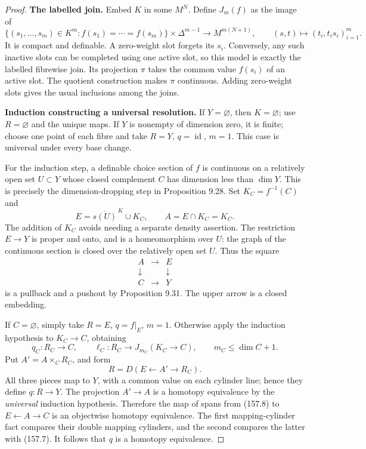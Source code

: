 \begin{proof}
\textbf{The labelled join.}
Embed \(K\) in some \(M^N\). Define \(J_m(f)\) as the image of
\[
 \{(s_1,\ldots,s_m)\in K^m:f(s_1)=\cdots=f(s_m)\}
          \times\Delta^{m-1}
 \longrightarrow M^{m(N+1)},\qquad
 (s,t)\longmapsto(t_i,t_i s_i)_{i=1}^m.
 \tag{157.5}
\]
It is compact and definable. A zero-weight slot forgets its \(s_i\). Conversely, any such inactive slots can be completed using one active slot, so this model is exactly the labelled fibrewise join. Its projection \(\pi\) takes the common value \(f(s_i)\) of an active slot. The quotient construction makes \(\pi\) continuous. Adding zero-weight slots gives the usual inclusions among the joins.

\textbf{Induction constructing a universal resolution.}
If \(Y=\varnothing\), then \(K=\varnothing\); use \(R=\varnothing\) and the unique maps. If \(Y\) is nonempty of dimension zero, it is finite; choose one point of each fibre and take \(R=Y\), \(q=\operatorname{id}\), \(m=1\). This case is universal under every base change.

For the induction step, a definable choice section of \(f\) is continuous on a relatively open set \(U\subset Y\) whose closed complement \(C\) has dimension less than \(\dim Y\). This is precisely the dimension-dropping step in Proposition 9.28. Set \(K_C=f^{-1}(C)\) and
\[
 E=\overline{s(U)}^{\,K}\cup K_C,\qquad
 A=E\cap K_C=K_C.
 \tag{157.6}
\]
The addition of \(K_C\) avoids needing a separate density assertion. The restriction \(E\to Y\) is proper and onto, and is a homeomorphism over \(U\): the graph of the continuous section is closed over the relatively open set \(U\). Thus the square
\[
 \begin{matrix}
 A&\longrightarrow&E\\
 \downarrow&&\downarrow\\
 C&\longrightarrow&Y
 \end{matrix}
 \tag{157.7}
\]
is a pullback and a pushout by Proposition 9.31. The upper arrow is a closed embedding.

If \(C=\varnothing\), simply take \(R=E\), \(q=f|_E\), \(m=1\). Otherwise apply the induction hypothesis to \(K_C\to C\), obtaining
\[
 q_C:R_C\to C,\qquad
 \ell_C:R_C\to J_{m_C}(K_C\to C),\qquad
 m_C\le\dim C+1.
\]
Put \(A'=A\times_CR_C\), and form
\[
 R=D(E\leftarrow A'\to R_C).
 \tag{157.8}
\]
All three pieces map to \(Y\), with a common value on each cylinder line; hence they define \(q:R\to Y\). The projection \(A'\to A\) is a homotopy equivalence by the \emph{universal} induction hypothesis. Therefore the map of spans from (157.8) to \(E\leftarrow A\to C\) is an objectwise homotopy equivalence. The first mapping-cylinder fact compares their double mapping cylinders, and the second compares the latter with (157.7). It follows that \(q\) is a homotopy equivalence.


\end{proof}
